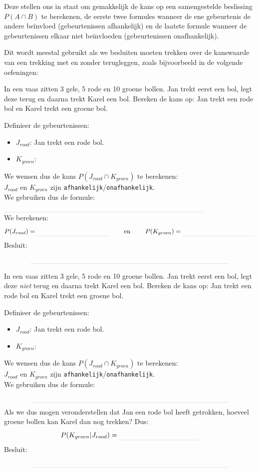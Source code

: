 \documentclass[12pt,twoside]{article}
\begin{document}
Deze stellen ons in staat om gemakkelijk de kans op een samengestelde beslissing $P(A\cap B)$ te berekenen, de eerste twee formules wanneer de ene gebeurtenis de andere beïnvloed (gebeurtenissen afhankelijk) en de laatste formule wanneer de gebeurtenissen elkaar niet beïnvloeden (gebeurtenissen onafhankelijk).

Dit wordt meestal gebruikt als we besluiten moeten trekken over de kanswaarde van een trekking met en zonder terugleggen, zoals bijvoorbeeld in de volgende oefeningen:

\begin{oefening}
In een vaas zitten 3 gele, 5 rode en 10 groene bollen. Jan trekt eerst een bol, legt deze terug en daarna trekt Karel een bol. Bereken de kans op: Jan trekt een rode bol en Karel trekt een groene bol.

Definieer de gebeurtenissen:
\begin{itemize}
  \itemsep0.1em
  \item $J_{rood}$: Jan trekt een rode bol.
  \item $K_{groen}$: \arulefill
\end{itemize}
\vspace*{0.5cm}
We wensen dus de kans $P(J_{rood}\cap K_{groen})$ te berekenen:\\
$J_{rood}$ en $K_{groen}$ zijn \verb#afhankelijk#/\verb#onafhankelijk#.\\
We gebruiken dus de formule:
$\arule{10cm}$\\
We berekenen:
$$P(J_{rood})=\arule{4cm} \qquad\mbox{ en }\qquad P(K_{groen})=\arule{4cm}$$
Besluit:
$$\arule{10cm}$$
\end{oefening}

\begin{oefening}
In een vaas zitten 3 gele, 5 rode en 10 groene bollen. Jan trekt eerst een bol, legt deze {\em niet} terug en daarna trekt Karel een bol. Bereken de kans op: Jan trekt een rode bol en Karel trekt een groene bol.

Definieer de gebeurtenissen:
\begin{itemize}
  \itemsep0.1em
  \item $J_{rood}$: Jan trekt een rode bol.
  \item $K_{groen}$: \arulefill
\end{itemize}
\vspace*{0.5cm}
We wensen dus de kans $P(J_{rood}\cap K_{groen})$ te berekenen:\\
$J_{rood}$ en $K_{groen}$ zijn \verb#afhankelijk#/\verb#onafhankelijk#.\\
We gebruiken dus de formule:
$$\arule{10cm}$$
Als we dus mogen veronderstellen dat Jan een rode bol heeft getrokken, hoeveel groene bollen kan Karel dan nog trekken? \arule{2cm}
Dus:
$$P(K_{groen}|J_{rood})=\arule{4cm}$$
Besluit:
$$\arule{10cm}$$
\end{oefening}
\end{document}

